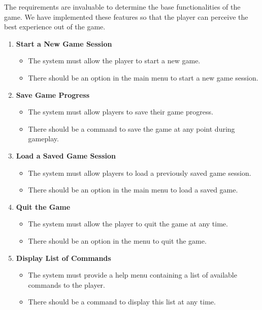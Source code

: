 \documentclass{article}
\begin{document}
 The requirements are invaluable to determine the base functionalities of the game. We have implemented these features so that the player can perceive the best experience out of the game.

 
    \begin{enumerate}
        \item \textbf{Start a New Game Session}
\begin{itemize}
    \item The system must allow the player to start a new game.
    \item There should be an option in the main menu to start a new game session.
\end{itemize}

    \item \textbf{Save Game Progress}
\begin{itemize}
    \item The system must allow players to save their game progress.
    \item There should be a command to save the game at any point during gameplay.
\end{itemize}

    \item \textbf{Load a Saved Game Session}
\begin{itemize}
    \item The system must allow players to load a previously saved game session.
    \item There should be an option in the main menu to load a saved game.
\end{itemize}

    \item \textbf{Quit the Game}
\begin{itemize}
    \item The system must allow the player to quit the game at any time.
    \item There should be an option in the menu to quit the game.
\end{itemize}

    \item \textbf{Display List of Commands}
\begin{itemize}
    \item The system must provide a help menu containing a list of available commands to the player.
    \item There should be a command to display this list at any time.
\end{itemize}


\end{enumerate}
\end{document}
